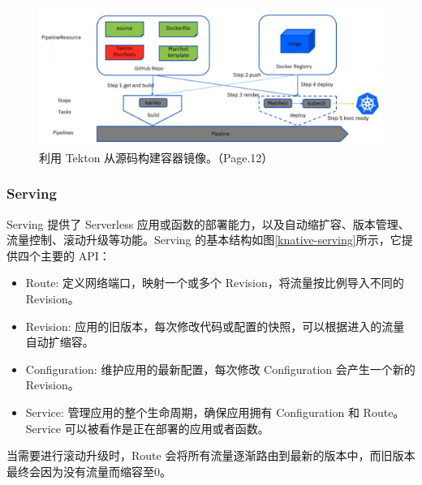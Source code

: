 \documentclass[11pt]{article}
\begin{document}
\begin{figure}[!htbp]
	\centering
	\includegraphics[width=1.0\linewidth]{figs/knative-source_to_image}
	\caption{利用 Tekton 从源码构建容器镜像。（\cite{knative-source_to_image}Page.12）}
	\label{figs:knative-source_to_image}
\end{figure}

\subsubsection{Serving}
Serving 提供了 Serverless 应用或函数的部署能力，以及自动缩扩容、版本管理、流量控制、滚动升级等功能。Serving 的基本结构如图\ref{knative-serving}所示，它提供四个主要的 API\cite{knative-servingapi}：
\begin{itemize}
	\item Route: 定义网络端口，映射一个或多个 Revision，将流量按比例导入不同的 Revision。
	\item Revision: 应用的旧版本，每次修改代码或配置的快照，可以根据进入的流量自动扩缩容。
	\item Configuration: 维护应用的最新配置，每次修改 Configuration 会产生一个新的 Revision。
	\item Service: 管理应用的整个生命周期，确保应用拥有 Configuration 和 Route。Service 可以被看作是正在部署的应用或者函数。
\end{itemize}
当需要进行滚动升级时，Route 会将所有流量逐渐路由到最新的版本中，而旧版本最终会因为没有流量而缩容至0。
\end{document}
